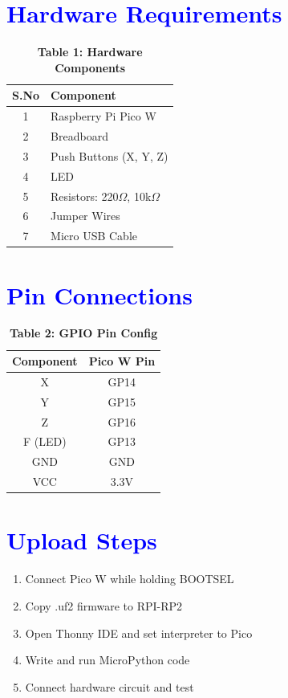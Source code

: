 \documentclass[twocolumn]{article}
\begin{document}
\section*{\textcolor{blue}{Hardware Requirements}}
\begin{table}[H]
\renewcommand{\arraystretch}{1.3}
\begin{tabular}{|c|l|}
\hline
\textbf{S.No} & \textbf{Component} \\ \hline
1 & Raspberry Pi Pico W \\
2 & Breadboard \\
3 & Push Buttons (X, Y, Z) \\
4 & LED \\
5 & Resistors: 220$\Omega$, 10k$\Omega$ \\
6 & Jumper Wires \\
7 & Micro USB Cable \\
\hline
\end{tabular}
\caption*{\textbf{Table 1: Hardware Components}}
\end{table}

\section*{\textcolor{blue}{Pin Connections}}
\begin{table}[H]
\renewcommand{\arraystretch}{1.3}
\begin{tabular}{|c|c|}
\hline
\textbf{Component} & \textbf{Pico W Pin} \\ \hline
X & GP14 \\
Y & GP15 \\
Z & GP16 \\
F (LED) & GP13 \\
GND & GND \\
VCC & 3.3V \\
\hline
\end{tabular}
\caption*{\textbf{Table 2: GPIO Pin Config}}
\end{table}

\section*{\textcolor{blue}{Upload Steps}}
\begin{enumerate}[label=\arabic*.]
    \item Connect Pico W while holding BOOTSEL
    \item Copy .uf2 firmware to RPI-RP2
    \item Open Thonny IDE and set interpreter to Pico
    \item Write and run MicroPython code
    \item Connect hardware circuit and test
\end{enumerate}
\end{document}
